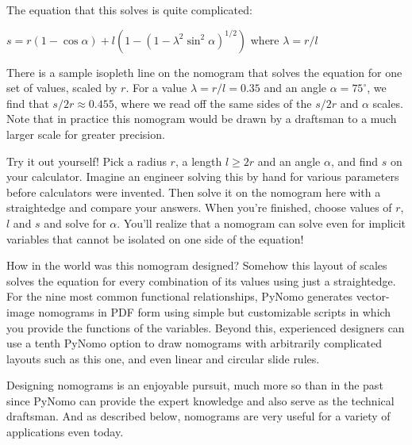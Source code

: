 \documentclass[a4paper,11pt,english]{sphinxmanual}
\begin{document}
The equation that this solves is quite complicated:

\(s = r(1 - \cos \alpha) + l(1 - (1 - \lambda^2 \sin^2 \alpha)^{1/2})\)
where \(\lambda = r/l\)

There is a sample isopleth line on the nomogram that solves the equation for one set of values, scaled by \(r\). For a value \(\lambda = r/l = 0.35\) and an angle \(\alpha = 75^{\circ}\), we find that \(s/2r \approx 0.455\), where we read off the same sides of the \(s/2r\) and \(\alpha\) scales. Note that in practice this nomogram would be drawn by a draftsman to a much larger scale for greater precision.

Try it out yourself! Pick a radius \(r\), a length \(l \geq 2r\) and an angle \(\alpha\), and find \(s\) on your calculator. Imagine an engineer solving this by hand for various parameters before calculators were invented. Then solve it on the nomogram here with a straightedge and compare your answers. When you’re finished, choose values of \(r\), \(l\) and \(s\) and solve for \(\alpha\). You’ll realize that a nomogram can solve even for implicit variables that cannot be isolated on one side of the equation!

How in the world was this nomogram designed? Somehow this layout of scales solves the equation for every combination of its values using just a straightedge. For the nine most common functional relationships, PyNomo generates vector-image nomograms in PDF form using simple but customizable scripts in which you provide the functions of the variables. Beyond this, experienced designers can use a tenth PyNomo option to draw nomograms with arbitrarily complicated layouts such as this one, and even linear and circular slide rules.

Designing nomograms is an enjoyable pursuit, much more so than in the past since PyNomo can provide the expert knowledge and also serve as the technical draftsman. And as described below, nomograms are very useful for a variety of applications even today.
\end{document}
